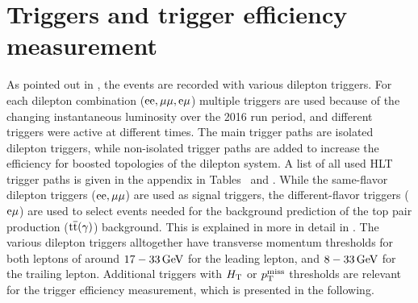 \section{Triggers and trigger efficiency measurement}\label{sec:triggEff}
As pointed out in , the events are recorded with various dilepton triggers. For each dilepton combination ($\mathrm{e}\mathrm{e},{\mu}{\mu},\mathrm{e}{\mu}$) multiple triggers are used because of the changing instantaneous luminosity over the 2016 run period, and different triggers were active at different times. The main trigger paths are isolated dilepton triggers, while non-isolated trigger paths are added to increase the efficiency for boosted topologies of the dilepton system. A list of all used HLT trigger paths is given in the appendix in Tables~ and . While the same-flavor dilepton triggers ($\mathrm{e}\mathrm{e},{\mu}{\mu}$) are used as signal triggers, the different-flavor triggers ($\mathrm{e}{\mu}$) are used to select events needed for the background prediction of the top pair production (${\mathrm{t}\overline{\mathrm{t}}}(\gamma)$) background. This is explained in more in detail in . The various dilepton triggers alltogether have transverse momentum thresholds for both leptons of around $17-33\,\text{Ge\hspace{-.08em}V}$ for the leading lepton, and $8-33\,\text{Ge\hspace{-.08em}V}$ for the trailing lepton. Additional triggers with $H_{\mathrm{T}}$ or $p_{\mathrm{T}}^\text{miss}$ thresholds are relevant for the trigger efficiency measurement, which is presented in the following.
